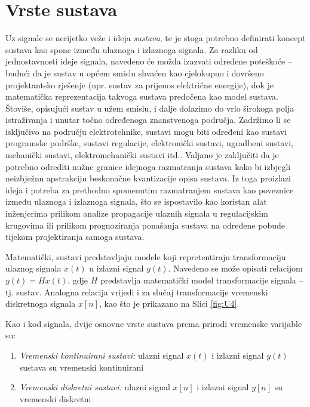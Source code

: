 \documentclass[a4paper,12pt,oneside]{memoir}
\begin{document}
        \section{Vrste sustava}
            Uz signale se nerijetko veže i ideja \textit{sustava}, te je stoga potrebno definirati koncept sustava kao spone između ulaznoga i izlaznoga signala. Za razliku od jednostavnosti ideje signala, navedeno će možda izazvati određene poteškoće -- budući da je sustav u općem smislu shvaćen kao cjelokupno i dovršeno projektantsko rješenje (npr. sustav za prijenos električne energije), dok je matematička reprezentacija takvoga sustava predočena kao model sustava. Štoviše, opisujući sustav u užem smislu, i dalje dolazimo do vrlo širokoga polja istraživanja i unutar točno određenoga znanstvenoga područja. Zadržimo li se isključivo na području elektrotehnike, sustavi mogu biti određeni kao sustavi programske podrške, sustavi regulacije, elektronički sustavi, ugradbeni sustavi, mehanički sustavi, elektromehanički sustavi itd.. Valjano je zaključiti da je potrebno odrediti nužne granice idejnoga razmatranja sustava kako bi izbjegli neizbježnu apstrakciju beskonačne kvantizacije opisa sustava. Iz toga proizlazi ideja i potreba za prethodno spomenutim razmatranjem sustava kao poveznice između ulaznoga i izlaznoga signala, što se ispostavilo kao koristan alat inženjerima prilikom analize propagacije ulaznih signala u regulacijskim krugovima ili prilikom prognoziranja ponašanja sustava na određene pobude tijekom projektiranja samoga sustava.

            Matematički, sustavi predstavljaju modele koji repretentiraju transformaciju ulaznog signala $x(t)$ u izlazni signal $y(t)$. Navedeno se može opisati relacijom $y(t)=Hx(t)$, gdje $H$ predstavlja matematički model transformacije signala -- tj. sustav. Analogna relacija vrijedi i za slučaj transformacije vremenski diskretnoga signala $x[n]$, kao što je prikazano na Slici \ref{fig:U4}.
            
            Kao i kod signala, dvije osnovne vrste sustava prema prirodi vremenske varijable su:
            \begin{enumerate}
                \item \textit{Vremenski kontinuirani sustavi:} ulazni signal $x(t)$ i izlazni signal $y(t)$ sustava su vremenski kontinuirani
                \item \textit{Vremenski diskretni sustavi:} ulazni signal $x[n]$ i izlazni signal $y[n]$ su vremenski diskretni
            \end{enumerate}
\end{document}
